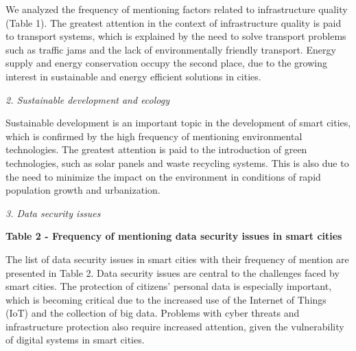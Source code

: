 {We analyzed the frequency of mentioning factors related to
infrastructure quality (Table 1). The greatest attention in the context
of infrastructure quality is paid to transport systems, which is
explained by the need to solve transport problems such as traffic jams
and the lack of environmentally friendly transport. Energy supply and
energy conservation occupy the second place, due to the growing interest
in sustainable and energy efficient solutions in cities.

\emph{2. Sustainable development and ecology}

Sustainable development is an important topic in the development of
smart cities, which is confirmed by the high frequency of mentioning
environmental technologies. The greatest attention is paid to the
introduction of green technologies, such as solar panels and waste
recycling systems. This is also due to the need to minimize the impact
on the environment in conditions of rapid population growth and
urbanization.

\emph{3. Data security issues}

{\bfseries Table 2 - Frequency of mentioning data security issues in smart
cities}


The list of data security issues in smart cities with their frequency of
mention are presented in Table 2. Data security issues are central to
the challenges faced by smart cities. The protection of
citizens'{} personal data is especially important, which
is becoming critical due to the increased use of the Internet of Things
(IoT) and the collection of big data. Problems with cyber threats and
infrastructure protection also require increased attention, given the
vulnerability of digital systems in smart cities.

}

